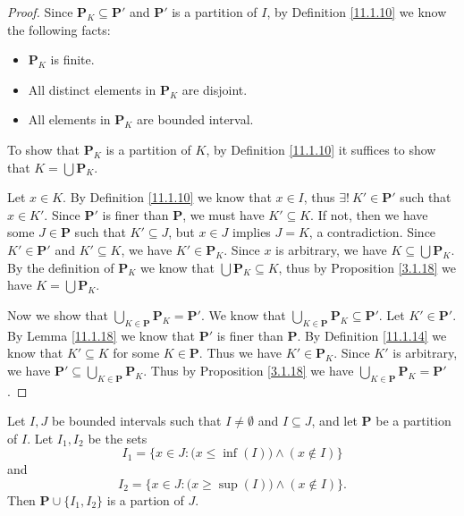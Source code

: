 \begin{proof}
    Since \(\mathbf{P}_K \subseteq \mathbf{P}'\) and \(\mathbf{P}'\) is a partition of \(I\), by Definition \ref{11.1.10} we know the following facts:
    \begin{itemize}
        \item \(\mathbf{P}_K\) is finite.
        \item All distinct elements in \(\mathbf{P}_K\) are disjoint.
        \item All elements in \(\mathbf{P}_K\) are bounded interval.
    \end{itemize}
    To show that \(\mathbf{P}_K\) is a partition of \(K\), by Definition \ref{11.1.10} it suffices to show that \(K = \bigcup \mathbf{P}_K\).

    Let \(x \in K\).
    By Definition \ref{11.1.10} we know that \(x \in I\), thus \(\exists!\ K' \in \mathbf{P}'\) such that \(x \in K'\).
    Since \(\mathbf{P}'\) is finer than \(\mathbf{P}\), we must have \(K' \subseteq K\).
    If not, then we have some \(J \in \mathbf{P}\) such that \(K' \subseteq J\), but \(x \in J\) implies \(J = K\), a contradiction.
    Since \(K' \in \mathbf{P}'\) and \(K' \subseteq K\), we have \(K' \in \mathbf{P}_K\).
    Since \(x\) is arbitrary, we have \(K \subseteq \bigcup \mathbf{P}_K\).
    By the definition of \(\mathbf{P}_K\) we know that \(\bigcup \mathbf{P}_K \subseteq K\), thus by Proposition \ref{3.1.18} we have \(K = \bigcup \mathbf{P}_K\).

    Now we show that \(\bigcup_{K \in \mathbf{P}} \mathbf{P}_K = \mathbf{P}'\).
    We know that \(\bigcup_{K \in \mathbf{P}} \mathbf{P}_K \subseteq \mathbf{P}'\).
    Let \(K' \in \mathbf{P}'\).
    By Lemma \ref{11.1.18} we know that \(\mathbf{P}'\) is finer than \(\mathbf{P}\).
    By Definition \ref{11.1.14} we know that \(K' \subseteq K\) for some \(K \in \mathbf{P}\).
    Thus we have \(K' \in \mathbf{P}_K\).
    Since \(K'\) is arbitrary, we have \(\mathbf{P}' \subseteq \bigcup_{K \in \mathbf{P}} \mathbf{P}_K\).
    Thus by Proposition \ref{3.1.18} we have \(\bigcup_{K \in \mathbf{P}} \mathbf{P}_K = \mathbf{P}'\).
\end{proof}

\begin{additional corollary}\label{ac 11.1.5}
Let \(I, J\) be bounded intervals such that \(I \neq \emptyset\) and \(I \subseteq J\), and let \(\mathbf{P}\) be a partition of \(I\).
Let \(I_1, I_2\) be the sets
\[
    I_1 = \Big\{x \in J : \big(x \leq \inf(I)\big) \land (x \notin I)\Big\}
\]
and
\[
    I_2 = \Big\{x \in J : \big(x \geq \sup(I)\big) \land (x \notin I)\Big\}.
\]
Then \(\mathbf{P} \cup \{I_1, I_2\}\) is a partion of \(J\).
\end{additional corollary}

